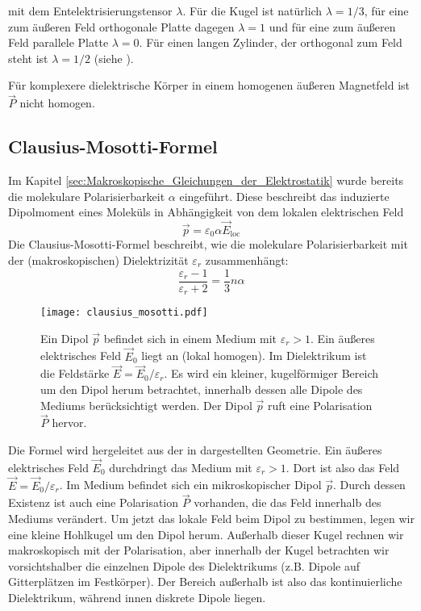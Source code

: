 mit dem Entelektrisierungstensor $\lambda$. Für die Kugel ist natürlich $\lambda =1/3$, für eine zum äußeren Feld orthogonale Platte dagegen $\lambda =1$ und für eine zum äußeren Feld parallele Platte $\lambda =0$. Für einen langen Zylinder, der orthogonal zum Feld steht ist $\lambda =1/2$ (siehe ).

Für komplexere dielektrische Körper in einem homogenen äußeren Magnetfeld ist $\vec {P}$ nicht homogen.

\subsection{Clausius-Mosotti-Formel}

Im Kapitel \ref{sec:Makroskopische_Gleichungen_der_Elektrostatik} wurde bereits die molekulare Polarisierbarkeit $\alpha $ eingeführt. Diese beschreibt das induzierte Dipolmoment eines Moleküls in Abhängigkeit von dem lokalen elektrischen Feld
\begin{equation*}
	\vec {p}=\varepsilon _{0}\alpha \vec {E}_{\mathrm{loc}}
\end{equation*}
Die Clausius-Mosotti-Formel beschreibt, wie die molekulare Polarisierbarkeit mit der (makroskopischen) Dielektrizität $\varepsilon _{r}$ zusammenhängt:
\begin{equation*}
	\frac{\varepsilon _{r}-1}{\varepsilon _{r}+2}=\frac{1}{3}n\alpha
\end{equation*}

\begin{figure}[htb]
	\centering
	\texttt{[image: clausius\_mosotti.pdf]}
	\caption{Ein Dipol $\vec p$ befindet sich in einem Medium mit $\varepsilon_r >1$. Ein äußeres elektrisches Feld $\vec E_0$ liegt an (lokal homogen). Im Dielektrikum ist die Feldstärke $\vec E=\vec E_0/\varepsilon_r$. Es wird ein kleiner, kugelförmiger Bereich um den Dipol herum betrachtet, innerhalb dessen alle Dipole des Mediums berücksichtigt werden. Der Dipol $\vec p$ ruft eine Polarisation $\vec P$ hervor. }
	\label{fig:clausius_mosotti}
\end{figure}

Die Formel wird hergeleitet aus der in  dargestellten Geometrie. Ein äußeres elektrisches Feld $\vec {E}_{0}$ durchdringt das Medium mit $\varepsilon _{r}>1$. Dort ist also das Feld $\vec {E}=\vec {E}_{0}/\varepsilon _{r}$. Im Medium befindet sich ein mikroskopischer Dipol $\vec {p}$. Durch dessen Existenz ist auch eine Polarisation $\vec {P}$ vorhanden, die das Feld innerhalb des Mediums verändert. Um jetzt das lokale Feld beim Dipol zu bestimmen, legen wir eine kleine Hohlkugel um den Dipol herum. Außerhalb dieser Kugel rechnen wir makroskopisch mit der Polarisation, aber innerhalb der Kugel betrachten wir vorsichtshalber die einzelnen Dipole des Dielektrikums (z.B. Dipole auf Gitterplätzen im Festkörper). Der Bereich außerhalb ist also das kontinuierliche Dielektrikum, während innen diskrete Dipole liegen.


